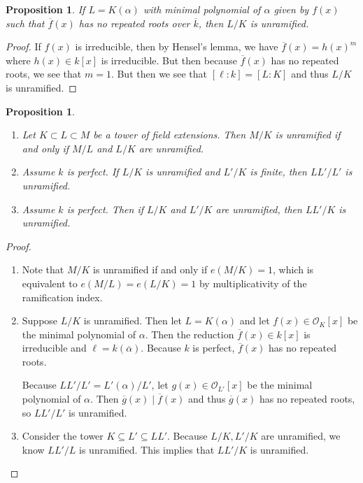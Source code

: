\documentclass[leqno, openany]{memoir}
\newtheorem{prop}[thm]{Proposition}
\theoremstyle{definition}
\theoremstyle{remark}
\theoremstyle{plain}
\theoremstyle{definition}
\theoremstyle{remark}
\newcommand{\mc}[1]{\mathcal{#1}}
\newcommand{\ol}[1]{\overline{#1}}
\begin{document}
\begin{prop}
    If $L = K(\alpha)$ with minimal polynomial of $\alpha$ given by $f(x)$ such that $\ol{f}(x)$ has no repeated roots over $\ol{k}$, then $L/K$ is unramified.
\end{prop}

\begin{proof}
    If $f(x)$ is irreducible, then by Hensel's lemma, we have $\ol{f}(x) = h(x)^m$ where $h(x) \in k[x]$ is irreducible. But then because $\ol{f}(x)$ has no repeated roots, we see that $m = 1$. But then we see that $[\ell : k] = [L:K]$ and thus $L/K$ is unramified.
\end{proof}

\begin{prop}\leavevmode
    \begin{enumerate}
        \item Let $K \subset L \subset M$ be a tower of field extensions. Then $M/K$ is unramified if and only if $M/L$ and $L/K$ are unramified.
        \item Assume $k$ is perfect. If $L/K$ is unramified and $L'/K$ is finite, then $LL'/L'$ is unramified.
        \item Assume $k$ is perfect. Then if $L/K$ and $L'/K$ are unramified, then $LL'/K$ is unramified.
    \end{enumerate}
\end{prop}

\begin{proof}\leavevmode
    \begin{enumerate}
        \item Note that $M/K$ is unramified if and only if $e(M/K) = 1$, which is equivalent to $e(M/L) = e(L/K) = 1$ by multiplicativity of the ramification index.
        \item Suppose $L/K$ is unramified. Then let $L = K(\alpha)$ and let $f(x) \in \mc{O}_K[x]$ be the minimal polynomial of $\alpha$. Then the reduction $\ol{f}(x) \in k[x]$ is irreducible and $\ell = k(\ol{\alpha})$. Because $k$ is perfect, $\ol{f}(x)$ has no repeated roots.

            Because $LL'/L' = L'(\alpha)/L'$, let $g(x) \in \mc{O}_{L'}[x]$ be the minimal polynomial of $\alpha$. Then $\ol{g}(x) \mid \ol{f}(x)$ and thus $\ol{g}(x)$ has no repeated roots, so $LL'/L'$ is unramified.
        \item Consider the tower $K \subseteq L' \subseteq LL'$. Because $L/K, L'/K$ are unramified, we know $LL'/L$ is unramified. This implies that $LL'/K$ is unramified. \qedhere
    \end{enumerate}
\end{proof}
\end{document}
